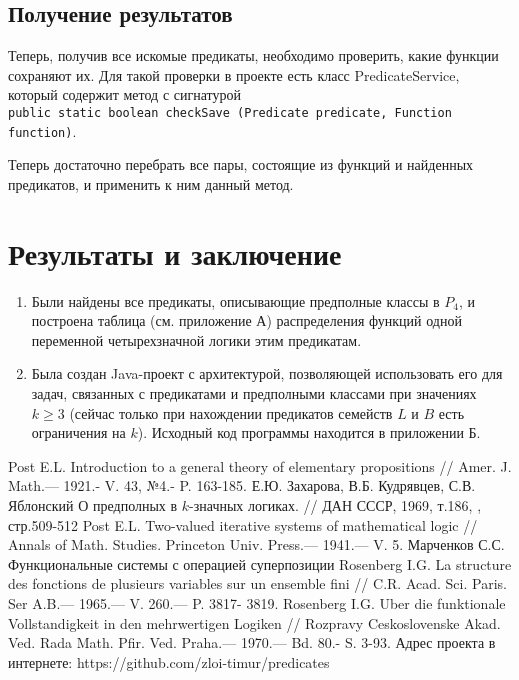 \documentclass[a4paper,14pt]{extreport}
\begin{document}
\section{Получение результатов}
Теперь, получив все искомые предикаты, необходимо проверить, какие функции сохраняют их. Для такой проверки в проекте есть класс PredicateService, который содержит метод с сигнатурой \\{\tt public static boolean checkSave (Predicate predicate, Function function)}. 

Теперь достаточно перебрать все пары, состоящие из функций и найденных предикатов, и применить к ним данный метод.

\newpage
\chapter{Результаты и заключение}
\begin{enumerate}
\item Были найдены все предикаты, описывающие предполные классы в $P_4$, и построена таблица (см. приложение А) распределения функций одной переменной четырехзначной логики этим предикатам. 
\item Была создан Java-проект с архитектурой, позволяющей использовать его для задач, связанных с предикатами и предполными классами при значениях $k \geqslant 3$ (сейчас только при нахождении предикатов семейств $L$ и $B$ есть ограничения на $k$).
Исходный код программы находится в приложении Б.
\end{enumerate}

\newpage
{}
\begin{thebibliography}{9}
	Post E.L. Introduction to a general theory of elementary propositions // 
Amer. J. Math.— 1921.- V. 43, №4.- P. 163-185. 
 Е.Ю. Захарова, В.Б. Кудрявцев, С.В. Яблонский О предполных в $k$-значных логиках. // ДАН СССР, 1969, т.186, , стр.509-512 
	Post E.L. Two-valued iterative systems of mathematical logic // Annals of 
Math. Studies. Princeton Univ. Press.— 1941.— V. 5. 
 Марченков С.С. Функциональные системы с операцией суперпозиции
	Rosenberg I.G. La structure des fonctions de plusieurs variables sur un ensemble fini // C.R. Acad. Sci. Paris. Ser A.B.— 1965.— V. 260.— P. 3817- 3819. 
	Rosenberg I.G. Uber die funktionale Vollstandigkeit in den mehrwertigen Logiken // Rozpravy Ceskoslovenske Akad. Ved. Rada Math. Pfir. Ved. Praha.— 1970.— Bd. 80.- S. 3-93. 
 Адрес проекта в интернете: https://github.com/zloi-timur/predicates 


\end{thebibliography}
\end{document}
